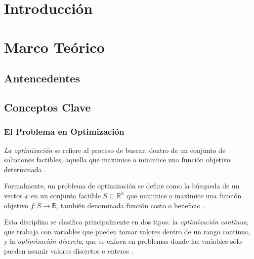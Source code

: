 \documentclass[12pt,titlepage,twoside,openright]{book}
\makeatletter
\def\cleardoublepage{\clearpage\if@twoside \ifodd\c@page\else
\hbox{}
\thispagestyle{empty}
\newpage
\if@twocolumn\hbox{}\newpage\fi\fi\fi}
\makeatother
\begin{document}
\tableofcontents
\cleardoublepage
\listoffigures
\cleardoublepage
\listoftables
\cleardoublepage

\mainmatter
\pagestyle{fancy}
\fancyhf{}
\fancyhead[RO,LE]{\bfseries \thepage}
\fancyhead[LO]{\nouppercase{\rightmark}}
\fancyhead[RE]{\nouppercase{\leftmark}}
\fancyfoot{}

\setlength{\parindent}{0pt}
\setlength{\parskip}{1.5ex}

\chapter{Introducción}
\label{cap:introduccion}

\chapter{Marco Teórico}
\label{cap:marco-teorico}
\section{Antencedentes}
\section{Conceptos Clave}
\subsection{El Problema en Optimización}

\textit{La optimización} se refiere al proceso de buscar, dentro de un conjunto de soluciones factibles, aquella que maximice o minimice una función objetivo determinada \citep{bazaraa2006nonlinear}.

Formalmente, un problema de optimización se define como la búsqueda de un vector \( x \) en un conjunto factible \( S \subseteq \mathbb{R}^n \) que minimice o maximice una función objetivo \( f: S \to \mathbb{R} \), también denominada función costo o beneficio \citep{cobos2010}.

Esta disciplina se clasifica principalmente en dos tipos: la \textit{optimización continua}, que trabaja con variables que pueden tomar valores dentro de un rango continuo, y la \textit{optimización discreta}, que se enfoca en problemas donde las variables sólo pueden asumir valores discretos o enteros \citep{cobos2010}.
\end{document}
